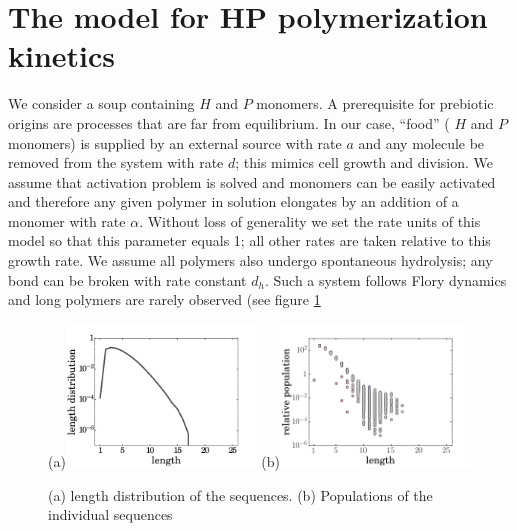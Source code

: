 \documentclass[journal=jacsat,manuscript=article,layout=twocolumn]{achemso}
\newcommand*{\ga}{\alpha}
\begin{document}
\section{The model for HP polymerization kinetics}

 We consider a soup containing $H$ and $P$ monomers. 
 A prerequisite for prebiotic origins are processes that are far from equilibrium.  In our case, 
``food'' ( $H$  and $P$ monomers) is supplied by an external source with rate $a$ and any molecule 
be removed from the system with rate $d$; this 
mimics cell growth and division. We assume that activation problem is solved and monomers can be 
easily activated and therefore any given polymer in solution elongates by an addition of a monomer 
with rate $\ga$.  
Without loss of generality we set the rate units of this model so that this parameter 
equals 1; all other rates are taken relative to this growth rate.  We assume all polymers also 
undergo spontaneous hydrolysis; any bond can be broken with rate constant $d_h$. Such a system 
follows Flory dynamics and long polymers are rarely observed (see figure \ref{fig:sim_pure_flory}
\begin{figure}[ht!]
  \centering
  (a)\includegraphics[width=0.45\textwidth]{pictures/floryDistrOnly16.pdf} 
  (b)\includegraphics[width=0.45\textwidth]{pictures/scatter01916.png} 
  \caption{\footnotesize{(a) length distribution of the sequences. (b) Populations of the 
individual sequences}}
  \label{fig:sim_pure_flory}
\end{figure}
\end{document}
